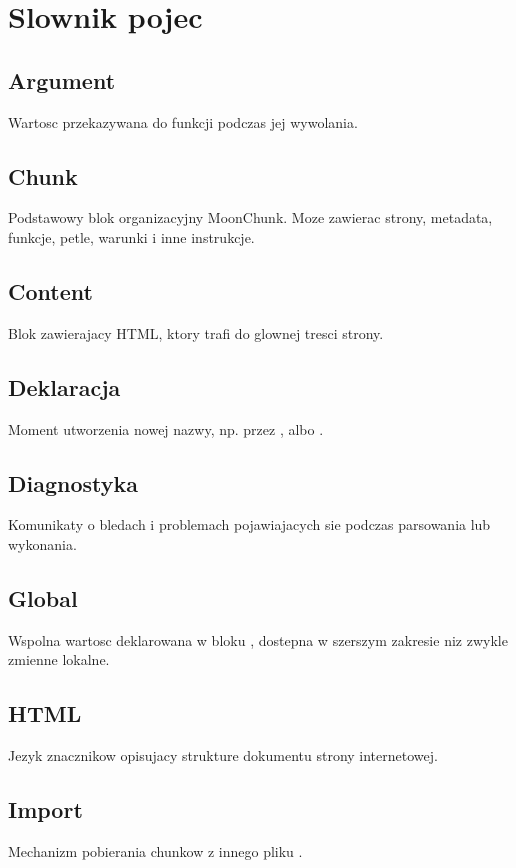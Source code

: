 \chapter{Slownik pojec}

\section*{Argument}
Wartosc przekazywana do funkcji podczas jej wywolania.

\section*{Chunk}
Podstawowy blok organizacyjny MoonChunk. Moze zawierac strony, metadata, funkcje,
petle, warunki i inne instrukcje.

\section*{Content}
Blok zawierajacy HTML, ktory trafi do glownej tresci strony.

\section*{Deklaracja}
Moment utworzenia nowej nazwy, np. przez ,  albo .

\section*{Diagnostyka}
Komunikaty o bledach i problemach pojawiajacych sie podczas parsowania lub wykonania.

\section*{Global}
Wspolna wartosc deklarowana w bloku , dostepna w szerszym zakresie niz zwykle
zmienne lokalne.

\section*{HTML}
Jezyk znacznikow opisujacy strukture dokumentu strony internetowej.

\section*{Import}
Mechanizm pobierania chunkow z innego pliku .

